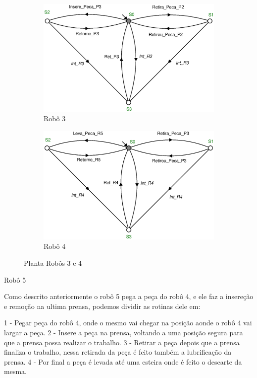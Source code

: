 \begin{figure}[H]%
  \centering
  \begin{subfigure}[b]{0.45\textwidth}
      \centering
      \includegraphics[width=\textwidth]{imagens/Robo_3.eps}
      \caption{Robô 3}
      \label{fig:r3}
  \end{subfigure}
  \hfill
  \begin{subfigure}[b]{0.45\textwidth}
      \centering
      \includegraphics[width=\textwidth]{imagens/Robo_4.eps}
      \caption{Robô 4}
      \label{fig:r4}
  \end{subfigure}
  \caption{Planta Robôs 3 e 4}
  \label{fig:robo34}
\end{figure}

Robô 5

Como descrito anteriormente o robô 5 pega a peça do robô 4, e ele faz a insereção e remoção na ultima prensa, podemos dividir as rotinas dele em: 

1 - Pegar peça do robô 4, onde o mesmo vai chegar na posição aonde o robô 4 vai largar a peça. 
2 - Insere a peça na prensa, voltando a uma posição segura para que a prensa possa realizar o trabalho. 
3 - Retirar a peça depois que a prensa finaliza o trabalho, nessa retirada da peça é feito também a lubrificação da prensa.
4 - Por final a peça é levada até uma esteira onde é feito o descarte da mesma. 

